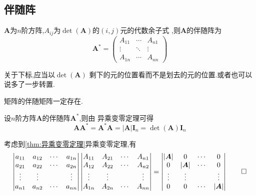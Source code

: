 \subsection{伴随阵}
\begin{formal}
\begin{definition}[伴随阵]\label{def:伴随阵}
    $\bm{A}$为$n$阶方阵,$A_{ij}$为$ \det\left(
        \bm{A}
    \right)$的$\left(i,j\right)$元的代数余子式
    ,则$\bm{A}$的伴随阵为
    \[
    \bm{A}^* = \begin{pmatrix}
        A_{11} & \cdots & A_{n1} \\
        \vdots & \ddots & \vdots \\
        A_{1n} & \cdots & A_{nn}
    \end{pmatrix}
    \]
\end{definition}
\end{formal}
\begin{red}
\begin{remark}
  关于下标,应当以$ \det\left(\bm{A}\right)$
剩下的元的位置看而不是划去的元的位置.或者也可以说多了一步转置.  
\end{remark}
\end{red}
\begin{red}
\begin{remark}
    矩阵的伴随矩阵一定存在.
\end{remark}
\end{red}
\begin{green}
\begin{lemma}[与伴随阵的积]\label{lem:与伴随阵的积}
    设$n$阶方阵$\bm{A}$的伴随阵$\bm{A}^*$,则由
    异乘变零定理可得
    \[
    \bm{A}\bm{A}^* =\bm{A}^*\bm{A}
      = \left|\bm{A}\right|\bm{I}_n
     =  \det\left(\bm{A}\right)\bm{I}_n
    \]
\end{lemma}
\begin{Proof}
考虑到\cref{thm:异乘变零定理}异乘变零定理,有
\begin{align*}
    \begin{vmatrix}
        a_{11}&a_{12}&\cdots&a_{1n}\\
        a_{21}&a_{22}&\cdots&a_{2n}\\
        \vdots&\vdots&&\vdots\\
        a_{n1}&a_{n2}&\cdots&a_{nn}
    \end{vmatrix}\begin{vmatrix}
        A_{11}&A_{21}&\cdots&A_{n1}\\
        A_{12}&A_{22}&\cdots&A_{n2}\\
        \vdots&\vdots&&\vdots\\
        A_{1n}&A_{2n}&\cdots&A_{nn}
    \end{vmatrix}=
    \begin{vmatrix}
        \left|\bm{A}\right|&0&\cdots&0\\
        0&\left|\bm{A}\right|&\cdots&0\\
        \vdots&\vdots&&\vdots\\
        0&0&\cdots&\left|\bm{A}\right|
    \end{vmatrix}\qedhere
\end{align*}
\end{Proof}
\end{green}
